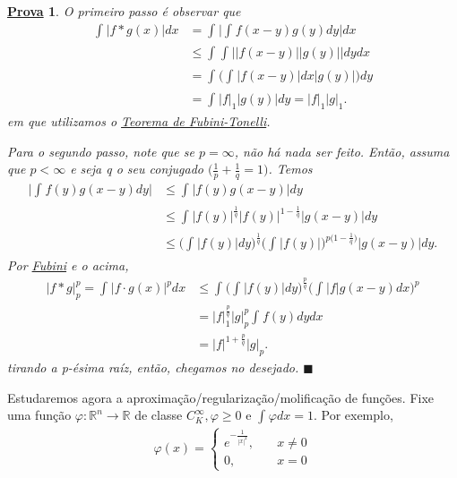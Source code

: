 \documentclass{article}
\newtheorem*{proof*}{\underline{Prova}}
\renewcommand\qedsymbol{$\blacksquare$}
\begin{document}
  \begin{proof*}
    O primeiro passo é observar que 
    \begin{align*}
      \int_{}^{}|f*g(x)|dx &= \int_{}^{}\biggl\vert \int_{}^{}f(x-y)g(y)dy \biggr\vert dx \\ 
                           &\leq \int_{}^{}\int_{}^{}\biggl\vert |f(x-y)||g(y)| \biggr\vert dydx\\ 
                           &=\int_{}^{}\biggl(\int_{}^{}|f(x-y)|dx|g(y)|\biggr)dy\\ 
                           &= \int_{}^{}|f|_1|g(y)|dy = |f|_1|g|_1.
    \end{align*}
    em que utilizamos o \hyperlink{fubini_tonelli}{\textit{Teorema de Fubini-Tonelli}}.

    Para o segundo passo, note que se \(p = \infty\), não há nada ser feito. Então, assuma que \(p < \infty\) e seja q o seu conjugado \(\biggl(\frac{1}{p} + \frac{1}{q} = 1\biggr)\). Temos 
    \begin{align*}
      \biggl\vert \int_{}^{}f(y)g(x-y)dy \biggr\vert &\leq \int_{}^{}|f(y)g(x-y)|dy \\ 
                                                     &\leq \int_{}^{}|f(y)|^{\frac{1}{q}}|f(y)|^{1-\frac{1}{q}}|g(x-y)|dy\\ 
                                                     &\leq \biggl(\int_{}^{}|f(y)|dy\biggr)^{\frac{1}{q}}\biggl(\int_{}^{}|f(y)|\biggr)^{p \biggl(1-\frac{1}{q}\biggr)}|g(x-y)|dy.
    \end{align*}
    Por \hyperlink{fubini_tonelli}{\textit{Fubini}} e o acima, 
    \begin{align*}
      |f*g|_{p}^{p} = \int_{}^{}|f \cdot g(x)|^{p}dx &\leq \int_{}^{}\biggl(\int_{}^{}|f(y)|dy\biggr)^{\frac{p}{q}}\biggl(\int_{}^{}|f|g(x-y)dx\biggr)^{p}\\ 
                                                     &= |f|_{1}^{\frac{p}{q}}|g|_{p}^{p}\int_{}^{}f(y)dydx\\ 
                                                     &= |f|^{1 + \frac{p}{q}}|g|_{p}.
    \end{align*}
    tirando a p-ésima raíz, então, chegamos no desejado. \qedsymbol
  \end{proof*}
  Estudaremos agora a aproximação/regularização/molificação de funções. Fixe uma função \(\varphi : \mathbb{R}^{n}\rightarrow \mathbb{R}\) de classe \(C_{K}^{\infty}, \varphi \geq 0\) e \(\int_{}^{}\varphi dx = 1\). Por exemplo,
    \[
      \varphi (x) = \left\{\begin{array}{ll}
          e^{-\frac{1}{|x|^{2}}},\quad &x\neq 0\\ 
          0,\quad &x = 0
        \end{array}\right.
    \]
\end{document}
